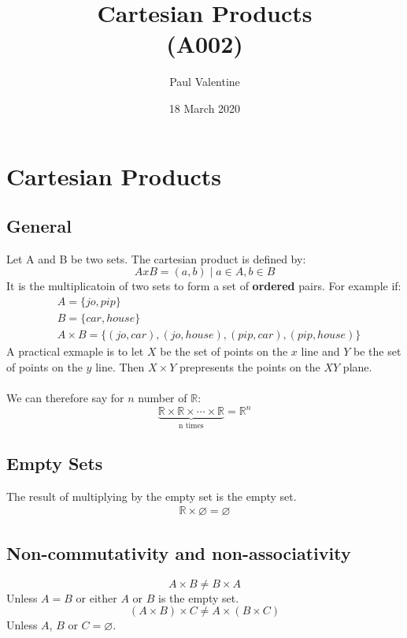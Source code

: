 \documentclass[a4paper]{article}
\title{\textbf{Cartesian Products}\\(A002)}
\author{Paul Valentine}
\date{18 March 2020}
\begin{document}
\maketitle
\section{Cartesian Products}
\subsection{General}
Let A and B be two sets. The cartesian product is defined by:
\begin{equation}
AxB = {(a,b)\mid a\in A, b\in B}
\end{equation}
It is the multiplicatoin of two sets to form a set of \textbf{ordered} pairs. For example if:
\begin{align*}
&A=\{ jo, pip \}\\
&B = \{car, house\}\\
&A\times B = \{(jo,car),(jo,house),(pip,car),(pip,house)\}
\end{align*}
A practical exmaple is to let $X$ be the set of points on the $x$ line and $Y$ be the set of points on the $y$ line. Then $X \times Y$ prepresents the points on the $XY$ plane.\\ \\
We can therefore say for $n$ number of $\mathbb{R}$:
\begin{equation}
\underbrace{\mathbb{R} \times \mathbb{R} \times \cdots \times \mathbb{R}}_{\text{n times}}=\mathbb{R}^n
\end{equation}
\subsection{Empty Sets}
The result of multiplying by the empty set is the empty set.
\begin{align}
  \mathbb{R} \times \varnothing = \varnothing
\end{align}
\subsection{Non-commutativity and non-associativity}
\begin{equation}
  A \times B \neq B \times A
\end{equation}
Unless $A=B$ or either $A$ or $B$ is the empty set.
\begin{equation}
  (A \times B) \times C \neq A \times (B \times C)
\end{equation}
Unless $A$, $B$ or $C =\varnothing$.
\end{document}
